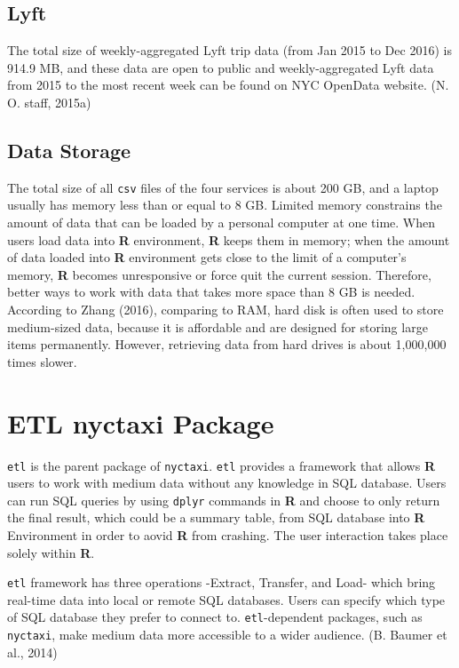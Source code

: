 \documentclass[12pt,twoside]{reedthesis}
\theoremstyle{definition}
\theoremstyle{definition}
\theoremstyle{definition}
\theoremstyle{remark}
\begin{document}
\subsection{Lyft}\label{lyft-1}

The total size of weekly-aggregated Lyft trip data (from Jan 2015 to Dec
2016) is 914.9 MB, and these data are open to public and
weekly-aggregated Lyft data from 2015 to the most recent week can be
found on NYC OpenData website. (N. O. staff, 2015a)

\subsection{Data Storage}\label{data-storage}

The total size of all \texttt{csv} files of the four services is about
200 GB, and a laptop usually has memory less than or equal to 8 GB.
Limited memory constrains the amount of data that can be loaded by a
personal computer at one time. When users load data into \textbf{R}
environment, \textbf{R} keeps them in memory; when the amount of data
loaded into \textbf{R} environment gets close to the limit of a
computer's memory, \textbf{R} becomes unresponsive or force quit the
current session. Therefore, better ways to work with data that takes
more space than 8 GB is needed. According to Zhang (2016), comparing to
RAM, hard disk is often used to store medium-sized data, because it is
affordable and are designed for storing large items permanently.
However, retrieving data from hard drives is about 1,000,000 times
slower.

\section{ETL nyctaxi Package}\label{etl-nyctaxi-package}

\texttt{etl} is the parent package of \texttt{nyctaxi}. \texttt{etl}
provides a framework that allows \textbf{R} users to work with medium
data without any knowledge in SQL database. Users can run SQL queries by
using \texttt{dplyr} commands in \textbf{R} and choose to only return
the final result, which could be a summary table, from SQL database into
\textbf{R} Environment in order to aovid \textbf{R} from crashing. The
user interaction takes place solely within \textbf{R}.

\texttt{etl} framework has three operations -Extract, Transfer, and
Load- which bring real-time data into local or remote SQL databases.
Users can specify which type of SQL database they prefer to connect to.
\texttt{etl}-dependent packages, such as \texttt{nyctaxi}, make medium
data more accessible to a wider audience. (B. Baumer et al., 2014)
\end{document}
